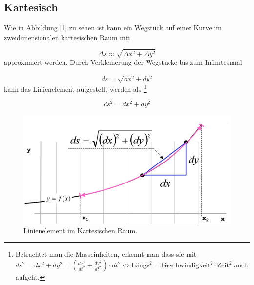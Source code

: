 %
%
%
%
\subsection{Kartesisch\label{geodaeten:section:Linienelemente:Kartesisch}}

Wie in Abbildung [\ref{geodaeten:figure:Linienelemente:Kartesisch:figure1}] zu sehen ist kann ein Wegstück auf einer Kurve im zweidimensionalen kartesischen Raum mit

\begin{equation}
	\Delta s \approx \sqrt{\Delta x^2 + \Delta y^2}
\end{equation}
approximiert werden.
Durch Verkleinerung der Wegstücke bis zum Infinitesimal 

\begin{equation}
	d s = \sqrt{d x^2 + d y^2}
\end{equation}
kann das Linienelement aufgestellt werden als \footnote{
Betrachtet man die Masseinheiten, erkennt man dass sie mit $ds^2 = dx^2 + dy^2 = \left( \frac{dx^2}{dt^2}+\frac{dy^2}{dt^2} \right) \cdot dt^2 \Leftrightarrow \text{Länge}^2 = \text{Geschwindigkeit}^2 \cdot \text{Zeit}^2$ auch aufgeht.
}

\begin{equation}
 	ds^2 = d x^2 + d y^2
 	\label{geodaeten:equation:Linienelemente:Kartesisch:equation1}
\end{equation}



\begin{figure}
	\centering
	
	\includegraphics[width=0.7\linewidth]{papers/geodaeten/Abbildungen/Linienelemente/LinKartes1}
	\caption{Linienelement im Kartesischen Raum. \cite{geodaeten:kartesisch}} 
	\label{geodaeten:figure:Linienelemente:Kartesisch:figure1}	
\end{figure}
